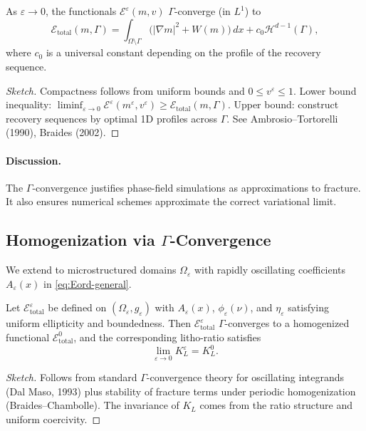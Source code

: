\begin{theorem}\label{thm:AT-gamma}
As $\varepsilon\to 0$, the functionals $\mathcal{E}^\varepsilon(m,v)$ $\Gamma$-converge (in $L^1$) to 
\[
  \mathcal{E}_{\mathrm{total}}(m,\Gamma)
   = \int_{\Omega\setminus\Gamma}\big(|\nabla m|^2+W(m)\big)\,dx
     + c_0 \mathcal{H}^{d-1}(\Gamma),
\]
where $c_0$ is a universal constant depending on the profile of the recovery sequence.
\end{theorem}

\begin{proof}[Sketch]
Compactness follows from uniform bounds and $0\le v^\varepsilon\le 1$.
Lower bound inequality: $\liminf_{\varepsilon\to 0}\mathcal{E}^\varepsilon(m^\varepsilon,v^\varepsilon)\ge \mathcal{E}_{\mathrm{total}}(m,\Gamma)$.  
Upper bound: construct recovery sequences by optimal 1D profiles across $\Gamma$.  
See Ambrosio--Tortorelli (1990), Braides (2002).
\end{proof}

\paragraph{Discussion.}
The $\Gamma$-convergence justifies phase-field simulations as approximations to fracture.
It also ensures numerical schemes approximate the correct variational limit.

\subsection{Homogenization via $\Gamma$-Convergence}
We extend to microstructured domains $\Omega_\varepsilon$ with rapidly oscillating coefficients $A_\varepsilon(x)$ in \eqref{eq:Eord-general}.  

\begin{theorem}\label{thm:gamma-homogenization}
Let $\mathcal{E}_{\mathrm{total}}^\varepsilon$ be defined on $(\Omega_\varepsilon,g_\varepsilon)$ with $A_\varepsilon(x)$, $\phi_\varepsilon(\nu)$, 
and $\eta_\varepsilon$ satisfying uniform ellipticity and boundedness.  
Then $\mathcal{E}_{\mathrm{total}}^\varepsilon$ $\Gamma$-converges to a homogenized functional $\mathcal{E}_{\mathrm{total}}^0$, and the corresponding litho-ratio satisfies
\[
  \lim_{\varepsilon\to 0} K_L^\varepsilon = K_L^0.
\]
\end{theorem}

\begin{proof}[Sketch]
Follows from standard $\Gamma$-convergence theory for oscillating integrands (Dal Maso, 1993) plus stability of fracture terms under periodic homogenization (Braides--Chambolle).  
The invariance of $K_L$ comes from the ratio structure and uniform coercivity.
\end{proof}

